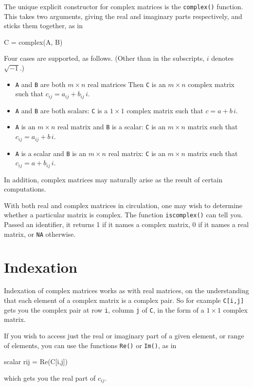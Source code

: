 The unique explicit constructor for complex matrices is the
\texttt{complex()} function. This takes two arguments, giving the real
and imaginary parts respectively, and sticks them together, as in
\begin{code}
C = complex(A, B)
\end{code}
Four cases are supported, as follows. (Other than in the subscripts,
$i$ denotes $\sqrt{-1}$.)
\begin{itemize}
\item \texttt{A} and \texttt{B} are both $m \times n$ real matrices
  Then \texttt{C} is an $m \times n$ complex matrix such that
  $c_{ij} = a_{ij} + b_{ij}\,i$.
\item \texttt{A} and \texttt{B} are both scalars: \texttt{C} is a
  $1 \times 1$ complex matrix such that $c = a + b\,i$.
\item \texttt{A} is an $m \times n$ real matrix and \texttt{B} is a
  scalar: \texttt{C} is an $m \times n$ matrix such that
  $c_{ij} = a_{ij} + b\,i$.
\item \texttt{A} is a scalar and \texttt{B} is an $m \times n$ real
  matrix: \texttt{C} is an $m \times n$ matrix such that
  $c_{ij} = a + b_{ij}\,i$.
\end{itemize}

In addition, complex matrices may naturally arise as the result of
certain computations.

With both real and complex matrices in circulation, one may wish to
determine whether a particular matrix is complex. The function
\texttt{iscomplex()} can tell you. Passed an identifier, it returns 1
if it names a complex matrix, 0 if it names a real matrix, or
\texttt{NA} otherwise.

\section{Indexation}

Indexation of complex matrices works as with real matrices, on the
understanding that each element of a complex matrix is a complex
pair. So for example \texttt{C[i,j]} gets you the complex pair at row
\texttt{i}, column \texttt{j} of \texttt{C}, in the form of a
$1 \times 1$ complex matrix.

If you wish to access just the real or imaginary part of a given
element, or range of elements, you can use the functions \texttt{Re()}
or \texttt{Im()}, as in
\begin{code}
scalar rij = Re(C[i,j])
\end{code}
which gets you the real part of $c_{ij}$.

